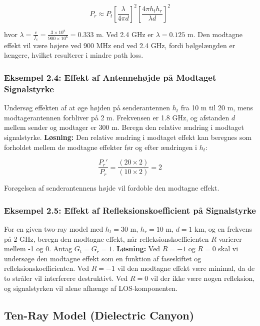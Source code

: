\documentclass[a4paper,12pt]{book}
\begin{document}
	\[
	P_r \approx P_t \left[ \frac{\lambda}{4\pi d} \right]^2 \left[ \frac{4\pi h_t h_r}{\lambda d} \right]^2
	\]
	
	\noindent hvor \( \lambda = \frac{c}{f_c} = \frac{3 \times 10^8}{900 \times 10^6} = 0.333 \) m. Ved 2.4 GHz er \( \lambda = 0.125 \) m. Den modtagne effekt vil være højere ved 900 MHz end ved 2.4 GHz, fordi bølgelængden er længere, hvilket resulterer i mindre path loss.
	
	\subsubsection{Eksempel 2.4: Effekt af Antennehøjde på Modtaget Signalstyrke}
	
	\noindent Undersøg effekten af at øge højden på senderantennen \( h_t \) fra 10 m til 20 m, mens modtagerantennen forbliver på 2 m. Frekvensen er 1.8 GHz, og afstanden \( d \) mellem sender og modtager er 300 m. Beregn den relative ændring i modtaget signalstyrke.
	\newline\newline
	\noindent \textbf{Løsning:} Den relative ændring i modtaget effekt kan beregnes som forholdet mellem de modtagne effekter før og efter ændringen i \( h_t \):
	
	\[
	\frac{P_r'}{P_r} = \frac{(20 \times 2)}{(10 \times 2)} = 2
	\]
	
	\noindent Forøgelsen af senderantennens højde vil fordoble den modtagne effekt.
	
	\subsubsection{Eksempel 2.5: Effekt af Refleksionskoefficient på Signalstyrke}
	
	\noindent For en given two-ray model med \( h_t = 30 \) m, \( h_r = 10 \) m, \( d = 1 \) km, og en frekvens på 2 GHz, beregn den modtagne effekt, når refleksionskoefficienten \( R \) varierer mellem -1 og 0. Antag \( G_t = G_r = 1 \).
	\newline\newline
	\noindent \textbf{Løsning:} Ved \( R = -1 \) og \( R = 0 \) skal vi undersøge den modtagne effekt som en funktion af faseskiftet og refleksionskoefficienten. Ved \( R = -1 \) vil den modtagne effekt være minimal, da de to stråler vil interferere destruktivt. Ved \( R = 0 \) vil der ikke være nogen refleksion, og signalstyrken vil alene afhænge af LOS-komponenten.
	
	
	\subsection{Ten-Ray Model (Dielectric Canyon)}
	
\end{document}
